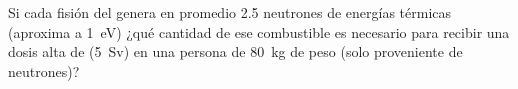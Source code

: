 \documentclass[./../main.tex]{subfiles}
\begin{document}
	\begin{exercise}
		Si cada fisión del  genera en promedio 2.5 neutrones de energías térmicas (aproxima a \qty{1}{\eV}) ¿qué cantidad de ese combustible es necesario para recibir una dosis alta de (\qty{5}{\sievert}) en una persona de \qty{80}{\kg} de peso (solo proveniente de neutrones)?
	\end{exercise}
\end{document}
